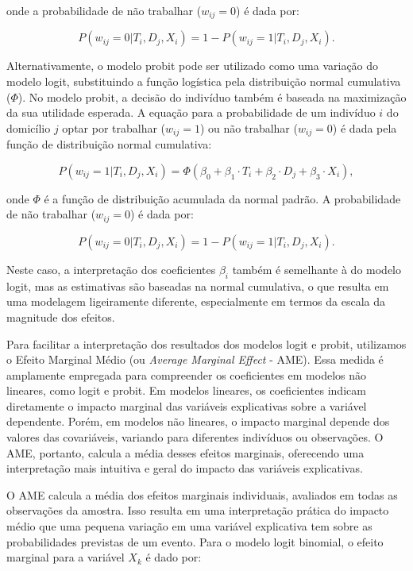 \documentclass[12pt, a4paper, openany]{book}
\numberwithin{equation}{chapter}
\numberwithin{table}{chapter}
\numberwithin{figure}{chapter}
\theoremstyle{break}
\begin{document}
onde a probabilidade de não trabalhar (\(w_{ij} = 0\)) é dada por:

\[
P(w_{ij} = 0 | T_i, D_j, X_i) = 1 - P(w_{ij} = 1 | T_i, D_j, X_i).
\]

Alternativamente, o modelo probit pode ser utilizado como uma variação do modelo logit, substituindo a função logística pela distribuição normal cumulativa (\(\Phi\)). No modelo probit, a decisão do indivíduo também é baseada na maximização da sua utilidade esperada. A equação para a probabilidade de um indivíduo \(i\) do domicílio \(j\) optar por trabalhar (\(w_{ij} = 1\)) ou não trabalhar (\(w_{ij} = 0\)) é dada pela função de distribuição normal cumulativa:

\[
P(w_{ij} = 1 | T_i, D_j, X_i) = \Phi\left( \beta_0 + \beta_1 \cdot T_i + \beta_2 \cdot D_j + \beta_3 \cdot X_i \right),
\]

onde \(\Phi\) é a função de distribuição acumulada da normal padrão. A probabilidade de não trabalhar (\(w_{ij} = 0\)) é dada por:

\[
P(w_{ij} = 0 | T_i, D_j, X_i) = 1 - P(w_{ij} = 1 | T_i, D_j, X_i).
\]

Neste caso, a interpretação dos coeficientes \(\beta_i\) também é semelhante à do modelo logit, mas as estimativas são baseadas na normal cumulativa, o que resulta em uma modelagem ligeiramente diferente, especialmente em termos da escala da magnitude dos efeitos.

Para facilitar a interpretação dos resultados dos modelos logit e probit, utilizamos o Efeito Marginal Médio (ou \textit{Average Marginal Effect} - AME). Essa medida é amplamente empregada para compreender os coeficientes em modelos não lineares, como logit e probit. Em modelos lineares, os coeficientes indicam diretamente o impacto marginal das variáveis explicativas sobre a variável dependente. Porém, em modelos não lineares, o impacto marginal depende dos valores das covariáveis, variando para diferentes indivíduos ou observações. O AME, portanto, calcula a média desses efeitos marginais, oferecendo uma interpretação mais intuitiva e geral do impacto das variáveis explicativas.

O AME calcula a média dos efeitos marginais individuais, avaliados em todas as observações da amostra. Isso resulta em uma interpretação prática do impacto médio que uma pequena variação em uma variável explicativa tem sobre as probabilidades previstas de um evento. Para o modelo logit binomial, o efeito marginal para a variável \(X_k\) é dado por:
\end{document}
